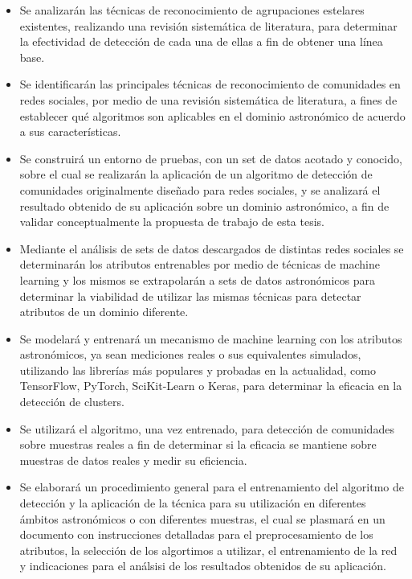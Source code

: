 \documentclass[
	11pt,oneside,a4paper,
	headsepline,footsepline,
	fleqn,
]{memoir}
\begin{document}
\begin{itemize}
	\item Se analizarán las técnicas de reconocimiento de agrupaciones estelares existentes, realizando una revisión sistemática de literatura, para determinar la efectividad de detección de cada una de ellas a fin de obtener una línea base.
	
	\item Se identificarán las principales técnicas de reconocimiento de comunidades en redes sociales, por medio de una revisión sistemática de literatura, a fines de establecer qué algoritmos son aplicables en el dominio astronómico de acuerdo a sus características.
	
	\item Se construirá un entorno de pruebas, con un set de datos acotado y conocido, sobre el cual se realizarán la aplicación de un algoritmo de detección de comunidades originalmente diseñado para redes sociales, y se analizará el resultado obtenido de su aplicación sobre un dominio astronómico, a fin de validar conceptualmente la propuesta de trabajo de esta tesis.
	
	\item Mediante el análisis de sets de datos descargados de distintas redes sociales se determinarán los atributos entrenables por medio de técnicas de machine learning y los mismos se extrapolarán a sets de datos astronómicos para determinar la viabilidad de utilizar las mismas técnicas para detectar atributos de un dominio diferente.
		
	\item Se modelará y entrenará un mecanismo de machine learning con los atributos astronómicos, ya sean mediciones reales o sus equivalentes simulados, utilizando las librerías más populares y probadas en la actualidad, como TensorFlow, PyTorch, SciKit-Learn o Keras, para determinar la eficacia en la detección de clusters.
	
	\item Se utilizará el algoritmo, una vez entrenado, para detección de comunidades sobre muestras reales a fin de determinar si la eficacia se mantiene sobre muestras de datos reales y medir su eficiencia.
	
	\item Se elaborará un procedimiento general para el entrenamiento del algoritmo de detección y la aplicación de la técnica para su utilización en diferentes ámbitos astronómicos o con diferentes muestras, el cual se plasmará en un documento con instrucciones detalladas para el preprocesamiento de los atributos, la selección de los algortimos a utilizar, el entrenamiento de la red y indicaciones para el análsisi de los resultados obtenidos de su aplicación.
\end{itemize}
\end{document}
